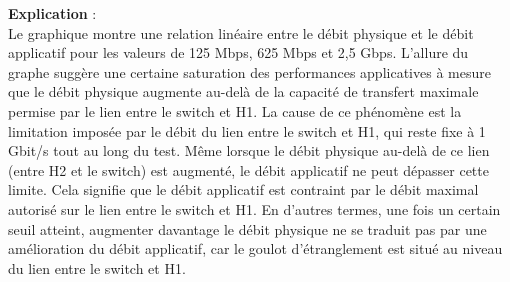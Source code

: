 \newpage
\textbf{Explication} :\\
Le graphique montre une relation linéaire entre le débit physique et le débit applicatif pour les valeurs de 125 Mbps, 625 Mbps et 2,5 Gbps.  L’allure du graphe suggère une certaine saturation des performances applicatives à mesure que le débit physique augmente au-delà de la capacité de transfert maximale permise par le lien entre le switch et H1.
La cause de ce phénomène est la limitation imposée par le débit du lien entre le switch et H1, qui reste fixe à 1 Gbit/s tout au long du test. Même lorsque le débit physique au-delà de ce lien (entre H2 et le switch) est augmenté, le débit applicatif ne peut dépasser cette limite. Cela signifie que le débit applicatif est contraint par le débit maximal autorisé sur le lien entre le switch et H1. En d’autres termes, une fois un certain seuil atteint, augmenter davantage le débit physique ne se traduit pas par une amélioration du débit applicatif, car le goulot d'étranglement est situé au niveau du lien entre le switch et H1.